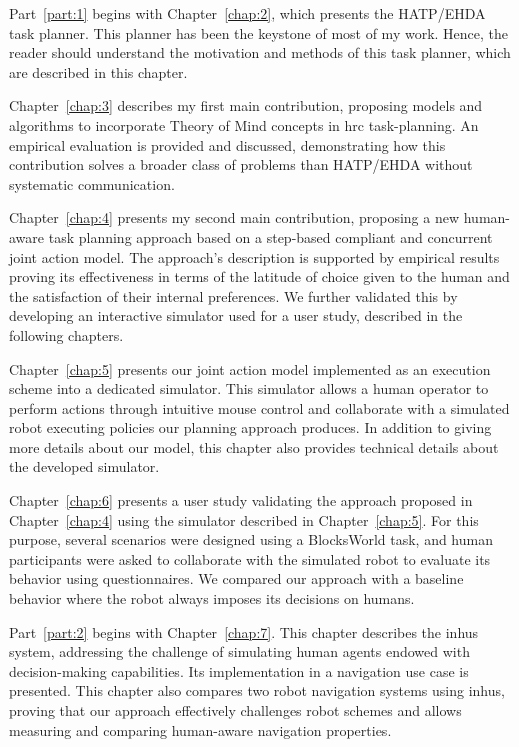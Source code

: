 Part~\ref{part:1} begins with Chapter~\ref{chap:2}, which presents the HATP/EHDA task planner. This planner has been the keystone of most of my work. Hence, the reader should understand the motivation and methods of this task planner, which are described in this chapter.

Chapter~\ref{chap:3} describes my first main contribution, proposing models and algorithms to incorporate Theory of Mind concepts in \acrshort{hrc} task-planning. An empirical evaluation is provided and discussed, demonstrating how this contribution solves a broader class of problems than HATP/EHDA without systematic communication.

Chapter~\ref{chap:4} presents my second main contribution, proposing a new human-aware task planning approach based on a step-based compliant and concurrent joint action model. The approach's description is supported by empirical results proving its effectiveness in terms of the latitude of choice given to the human and the satisfaction of their internal preferences. We further validated this by developing an interactive simulator used for a user study, described in the following chapters.

Chapter~\ref{chap:5} presents our joint action model implemented as an execution scheme into a dedicated simulator. 
This simulator allows a human operator to perform actions through intuitive mouse control and collaborate with a simulated robot executing policies our planning approach produces. In addition to giving more details about our model, this chapter also provides technical details about the developed simulator. 

Chapter~\ref{chap:6} presents a user study validating the approach proposed in Chapter~\ref{chap:4} using the simulator described in Chapter~\ref{chap:5}. For this purpose, several scenarios were designed using a BlocksWorld task, and human participants were asked to collaborate with the simulated robot to evaluate its behavior using questionnaires. We compared our approach with a baseline behavior where the robot always imposes its decisions on humans. 

Part~\ref{part:2} begins with Chapter~\ref{chap:7}.
This chapter describes the \acrshort{inhus} system, addressing the challenge of simulating human agents endowed with decision-making capabilities. Its implementation in a navigation use case is presented. This chapter also compares two robot navigation systems using \acrshort{inhus}, proving that our approach effectively challenges robot schemes and allows measuring and comparing human-aware navigation properties.


